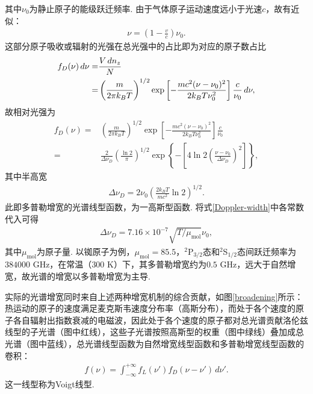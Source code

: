 \documentclass[a4paper, 10pt]{article}
\newcounter{subsubsubsection}[subsubsection]
\begin{document}
\begin{multicols*}{2}
其中$\nu_0$为静止原子的能级跃迁频率. 由于气体原子运动速度远小于光速$c$，故有近似：
\begin{align}
    \nu=\left(1-\frac{v}{c}\right)\nu_0.
\end{align}
这部分原子吸收或辐射的光强在总光强中的占比即为对应的原子数占比
\begin{align}
    \notag f_D(\nu)\,d\nu=&\frac{V\,dn_z}{N}\\
    =&\left(\frac{m}{2\pi k_BT}\right)^{1/2}\exp\left[-\frac{mc^2(\nu-\nu_0)^2}{2k_BT\nu_0^2}\right]\frac{c}{\nu_0}\,d\nu,
\end{align}
故相对光强为
\begin{align}
    \nonumber f_D(\nu)=&\left(\frac{m}{2\pi k_BT}\right)^{1/2}\exp\left[-\frac{mc^2(\nu-\nu_0)^2}{2k_BT\nu_0^2}\right]\frac{c}{\nu_0}\\
    =&\frac{2}{\Delta\nu_D}\left(\frac{\ln 2}{\pi}\right)^{1/2}\exp\left\{-\left[4\ln 2\left(\frac{\nu-\nu_0}{\Delta\nu_D}\right)^2\right]\right\},
\end{align}
其中半高宽
\begin{align}
    \label{Doppler-width}
    \Delta\nu_D=2\nu_0\left(\frac{2k_BT}{mc^2}\ln 2\right)^{1/2}.
\end{align}
此即多普勒增宽的光谱线型函数，为一高斯型函数. 将式\eqref{Doppler-width}中各常数代入可得
\begin{align}
    \Delta\nu_D=7.16\times 10^{-7}\sqrt{T/\mu_{\text{mol}}}\nu_0,
\end{align}
其中$\mu_{\text{mol}}$为原子量. 以铷原子为例，$\mu_{\text{mol}}=85.5$，$^2$P$_{3/2}$态和$^2$S$_{1/2}$态间跃迁频率为$384000$ GHz，在常温（$300$ K）下，其多普勒增宽约为$0.5$ GHz，远大于自然增宽，故光谱的增宽以多普勒增宽为主导.


实际的光谱增宽同时来自上述两种增宽机制的综合贡献，如图\ref{broadening}所示：热运动的原子的速度满足麦克斯韦速度分布率（高斯分布），而处于各个速度的原子各自辐射出指数衰减的电磁波，因此处于各个速度的原子都对总光谱贡献洛伦兹线型的子光谱（图中红线），这些子光谱按照高斯型的权重（图中绿线）叠加成总光谱（图中蓝线），总光谱线型函数为自然增宽线型函数和多普勒增宽线型函数的卷积：
\begin{align}
    f(\nu)=\int_{-\infty}^{+\infty}f_L(\nu')f_D(\nu-\nu')\,d\nu'.
\end{align}
这一线型称为Voigt线型.


\end{multicols*}
\end{document}
